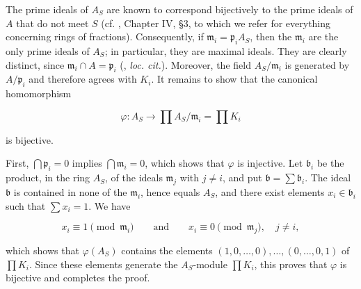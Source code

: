 The prime ideals of $A_S$ are known to correspond bijectively to the prime ideals of $A$ that do not meet $S$ (cf. , Chapter IV, \S 3, to which we refer for everything concerning rings of fractions). Consequently, if $\mathfrak{m}_i=\mathfrak{p}_iA_S$, then the $\mathfrak{m}_i$ are the only prime ideals of $A_S$; in particular, they are maximal ideals. They are clearly distinct, since $\mathfrak{m}_i\cap A=\mathfrak{p}_i$ (, \emph{loc. cit.}). Moreover, the field $A_S/\mathfrak{m}_i$ is generated by $A/\mathfrak{p}_i$ and therefore agrees with $K_i$. It remains to show that the canonical homomorphism

\begin{equation*}
\varphi:A_S\longrightarrow\prod A_S/\mathfrak{m}_i=\prod K_i
\end{equation*}

is bijective.

First, $\bigcap\mathfrak{p}_i=0$ implies $\bigcap\mathfrak{m}_i=0$, which shows that $\varphi$ is injective. Let $\mathfrak{b}_i$ be the product, in the ring $A_S$, of the ideals $\mathfrak{m}_j$ with $j\neq i$, and put $\mathfrak{b}=\sum\mathfrak{b}_i$. The ideal $\mathfrak{b}$ is contained in none of the $\mathfrak{m}_i$, hence equals $A_S$, and there exist elements $x_i\in\mathfrak{b}_i$ such that $\sum x_i=1$. We have

\begin{equation*}
x_i\equiv1\pmod{\mathfrak{m}_i}
\qquad\text{and}\qquad
x_i\equiv0\pmod{\mathfrak{m}_j},\quad j\neq i,
\end{equation*}

which shows that $\varphi(A_S)$ contains the elements $(1,0,\ldots,0),\ldots,(0,\ldots,0,1)$ of $\prod K_i$. Since these elements generate the $A_S$-module $\prod K_i$, this proves that $\varphi$ is bijective and completes the proof.
